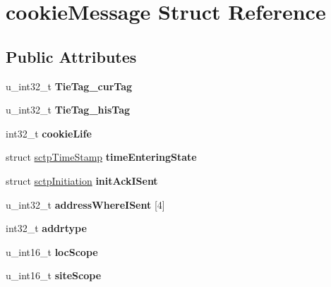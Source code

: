 \hypertarget{structcookie_message}{
\section{cookieMessage Struct Reference}
\label{structcookie_message}
}
\subsection*{Public Attributes}
\begin{DoxyCompactItemize}
\item 
\hypertarget{structcookie_message_a9a5bf72f08cd3ad48903e994b325f324}{
u\_\-int32\_\-t {\bfseries TieTag\_\-curTag}}
\label{structcookie_message_a9a5bf72f08cd3ad48903e994b325f324}

\item 
\hypertarget{structcookie_message_abbe380c8de5b35844965c39b7e0c69e3}{
u\_\-int32\_\-t {\bfseries TieTag\_\-hisTag}}
\label{structcookie_message_abbe380c8de5b35844965c39b7e0c69e3}

\item 
\hypertarget{structcookie_message_af5b71df7c40391ca39534f64b9a1bf85}{
int32\_\-t {\bfseries cookieLife}}
\label{structcookie_message_af5b71df7c40391ca39534f64b9a1bf85}

\item 
\hypertarget{structcookie_message_ab3201ef40d258d6051ae8829057b9261}{
struct \hyperlink{structsctp_time_stamp}{sctpTimeStamp} {\bfseries timeEnteringState}}
\label{structcookie_message_ab3201ef40d258d6051ae8829057b9261}

\item 
\hypertarget{structcookie_message_a6267e6b68db8afb2632a8fa38134228a}{
struct \hyperlink{structsctp_initiation}{sctpInitiation} {\bfseries initAckISent}}
\label{structcookie_message_a6267e6b68db8afb2632a8fa38134228a}

\item 
\hypertarget{structcookie_message_a62762a26bd44bfa21ad1cc9ec11b8cca}{
u\_\-int32\_\-t {\bfseries addressWhereISent} \mbox{[}4\mbox{]}}
\label{structcookie_message_a62762a26bd44bfa21ad1cc9ec11b8cca}

\item 
\hypertarget{structcookie_message_ada722682d2583059a45accea112d18be}{
int32\_\-t {\bfseries addrtype}}
\label{structcookie_message_ada722682d2583059a45accea112d18be}

\item 
\hypertarget{structcookie_message_a79d591699f82cb0ca3f8709fd8e4085a}{
u\_\-int16\_\-t {\bfseries locScope}}
\label{structcookie_message_a79d591699f82cb0ca3f8709fd8e4085a}

\item 
\hypertarget{structcookie_message_a6e1e753dfdd531db83b14f24ae21c997}{
u\_\-int16\_\-t {\bfseries siteScope}}
\label{structcookie_message_a6e1e753dfdd531db83b14f24ae21c997}

\end{DoxyCompactItemize}



